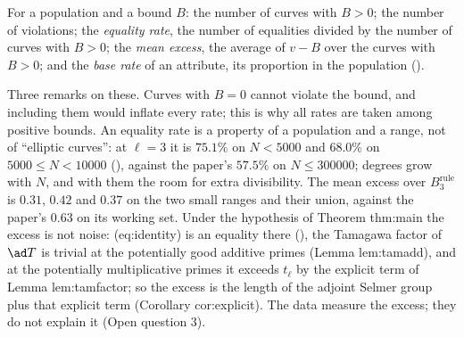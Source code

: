 \begin{sloppypar}
\begin{definition}[rates]\label{def:computation:rates}
For a population and a bound $B$: the number of curves with $B>0$; the number of violations; the \emph{equality rate}, the number of equalities
divided by the number of curves with $B>0$; the \emph{mean excess}, the average of $v-B$ over the curves with $B>0$; and the \emph{base rate} of an
attribute, its proportion in the population ().
\end{definition}

Three remarks on these. Curves with $B=0$ cannot violate the bound, and including them would inflate every rate; this is why all rates are
taken among positive bounds. An equality rate is a property of a population and a range, not of ``elliptic curves'': at $\ell=3$ it is $75.1\%$
on $N<5000$ and $68.0\%$ on $5000\le N<10000$ (), against the paper's $57.5\%$ on $N\le300000$; degrees grow with
$N$, and with them the room for extra divisibility. The mean excess over $B^{\mathrm{rule}}_3$ is $0.31$, $0.42$ and $0.37$ on the two small ranges and their
union, against the paper's $0.63$ on its working set. Under the hypothesis of Theorem thm:main the excess is not noise: (eq:identity) is an
equality there (), the Tamagawa factor of $\ad T$ is trivial at the potentially good additive primes (Lemma lem:tamadd), and at the
potentially multiplicative primes it exceeds $t_\ell$ by the explicit term of Lemma lem:tamfactor; so the excess is the length of the adjoint
Selmer group plus that explicit term (Corollary cor:explicit). The data measure the excess; they do not explain it (Open question 3).


\end{sloppypar}

